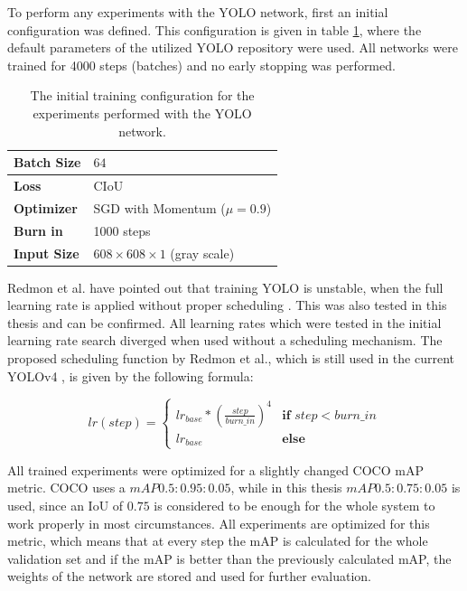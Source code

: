To perform any experiments with the \ac{YOLO} network, first an initial configuration was defined.
This configuration is given in table \ref{tab:initial_yolo_config}, where the default parameters of the utilized YOLO repository were used.
All networks were trained for 4000 steps (batches) and no early stopping was performed.

\begin{table}[H]
\footnotesize
\begin{center}
\begin{tabular}{|l|l|}

\hline
\textbf{Batch Size} & $64$\\
\hline
\textbf{Loss} & CIoU \\
\hline
\textbf{Optimizer} & \ac{SGD} with Momentum ($\mu = 0.9$)\\
\hline
\textbf{Burn in} & 1000 steps \\
\hline
\textbf{Input Size} & $608 \times 608 \times 1$ (gray scale) \\
\hline

\end{tabular}
\caption{The initial training configuration for the experiments performed with the YOLO network.}
\label{tab:initial_yolo_config}
\end{center}
\end{table}

Redmon et al. have pointed out that training \ac{YOLO} is unstable, when the full learning rate is applied without proper scheduling \cite{yolov2}.
This was also tested in this thesis and can be confirmed.
All learning rates which were tested in the initial learning rate search diverged when used without a scheduling mechanism.
The proposed scheduling function by Redmon et al., which is still used in the current \ac{YOLOv4} \cite{yolov4}, is given by the following formula:

\begin{equation}
    lr(step) =
    \begin{cases}
        lr_{base} * (\frac{step}{burn\_in})^4 & \textbf{if } step < burn\_in\\
        lr_{base}                             & \textbf{else}
    \end{cases}
\end{equation}

All trained experiments were optimized for a slightly changed COCO mAP metric.
COCO uses a $mAP0.5:0.95:0.05$, while in this thesis $mAP0.5:0.75:0.05$ is used, since an \ac{IoU} of $0.75$ is considered to be enough for the whole system to work properly in most circumstances.
All experiments are optimized for this metric, which means that at every step the mAP is calculated for the whole validation set and if the mAP is better than the previously calculated mAP, the weights of the network are stored and used for further evaluation.

